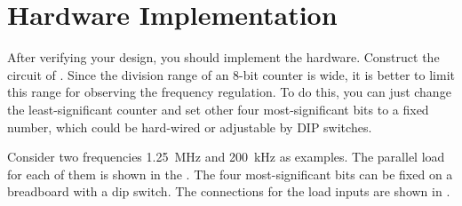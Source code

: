 \documentclass[12pt, logo=tehranDLDL/ut]{tehranDLDL}
\begin{document}
\designverification{}

\section{Hardware Implementation}

After verifying your design, you should implement the hardware. Construct the circuit of .  Since the division range of an 8-bit counter is wide, it is better to limit this range for observing the frequency regulation. To do this, you can just change the least-significant counter and set other four most-significant bits to a fixed number, which could be hard-wired or adjustable by DIP switches.

Consider two frequencies \SI{1.25}{\mega\hertz} and \SI{200}{\kilo\hertz} as examples. The parallel load for each of them is shown in the . The four most-significant bits can be fixed on a breadboard with a dip switch. The connections for the load inputs are shown in .
\end{document}
